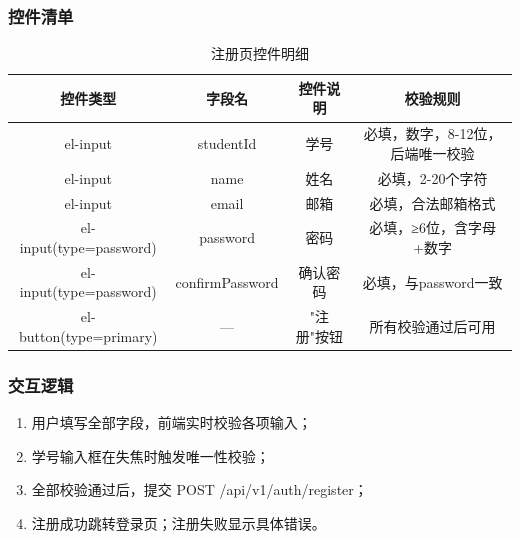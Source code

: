 \subsubsection{控件清单}
\begin{table}[htbp]
    \centering
    \caption{注册页控件明细}
    \begin{tabular}{|c|c|c|c|}
        \hline
        \textbf{控件类型} & \textbf{字段名} & \textbf{控件说明} & \textbf{校验规则} \\
        \hline
        el-input & studentId & 学号 & 必填，数字，8-12位，后端唯一校验 \\
        \hline
        el-input & name & 姓名 & 必填，2-20个字符 \\
        \hline
        el-input & email & 邮箱 & 必填，合法邮箱格式 \\
        \hline
        el-input(type=password) & password & 密码 & 必填，≥6位，含字母+数字 \\
        \hline
        el-input(type=password) & confirmPassword & 确认密码 & 必填，与password一致 \\
        \hline
        el-button(type=primary) & — & "注 册"按钮 & 所有校验通过后可用 \\
        \hline
    \end{tabular}
\end{table}

\subsubsection{交互逻辑}
\begin{enumerate}
    \item 用户填写全部字段，前端实时校验各项输入；
    \item 学号输入框在失焦时触发唯一性校验；
    \item 全部校验通过后，提交 POST /api/v1/auth/register；
    \item 注册成功跳转登录页；注册失败显示具体错误。
\end{enumerate}

